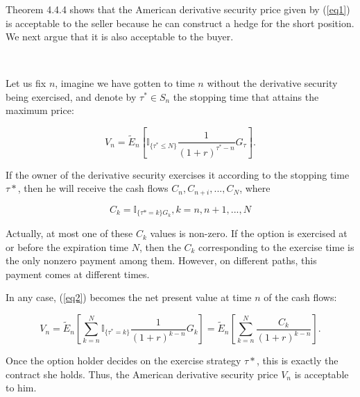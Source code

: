 \documentclass[c, dvipsnames, 8pt]{beamer}
\begin{document}
\begin{frame}[shrink=5]
\frametitle{\insertsection} 
\framesubtitle{\insertsubsection} 

			Theorem 4.4.4 shows that the American derivative security price given by (\ref{eq1}) is acceptable to the seller because he can construct a hedge for the
			short position. 			We next argue that it is also acceptable to the buyer. 
			
			\
			
			Let us 		fix $n$, imagine we have gotten to time $n$ without the derivative security being exercised, and denote by $\tau^* \in S_n$  the stopping time that attains the maximum price: 
			
			\begin{equation}\label{eq2}
			V_n =  \tilde{E}_n [\mathbb{I}_{\{\tau^* \leq N\}} \dfrac{1}{(1+r)^{\tau^*-n}}G_{\tau}].
			\end{equation}
			
			
			If the owner of the derivative security exercises it according to the stopping 
			time $\tau*$, then he will receive the cash flows $C_n, C_{n+i},..., C_N$, where

\begin{equation}\label{key}
C_k = \mathbb{I}_{\{\tau*=k\}G_k},  k = n,n+1,...,N
\end{equation}


			 Actually, at most one of these $C_k$  values is non-zero.
			If the option is exercised at or before the expiration time $N$, then the $C_k$
			corresponding to the exercise time is the only nonzero payment among them. However, on different paths, this payment comes at different times. 
			
			In any
			case, (\ref{eq2}) becomes the net present value at time $n$  of
			the cash flows:
			
			
				
			\begin{equation}\label{eq2}
			V_n =  \tilde{E}_n \left[\sum^N_{k=n}\mathbb{I}_{\{\tau^* =k\}} \dfrac{1}{(1+r)^{k-n}}G_k \right] = \tilde{E}_n \left[\sum^N_{k=n} \dfrac{C_k}{(1+r)^{k-n}}\right].
			\end{equation}
			
			
			
			
			Once the option holder decides on the exercise strategy $\tau*$, this is exactly
			the contract she holds. Thus, the American derivative security price $V_n$ is
			acceptable to him.
			



\end{frame}	
\end{document}
